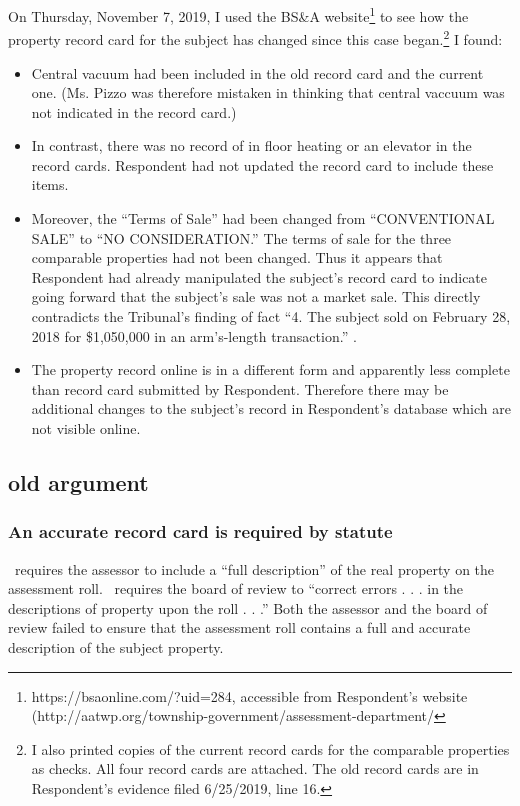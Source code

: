 \documentclass[12pt,\documentclassflag]{michiganCourtOfAppealsBrief}
\begin{document}
On Thursday, November 7, 2019, I used the BS&A website\footnote{https://bsaonline.com/?uid=284, accessible from   Respondent's website (http://aatwp.org/township-government/assessment-department/}
to see how the property record card for the subject has changed since this case began.\footnote{I also printed copies of the current record cards for the comparable properties as checks. All four record cards are attached. The old record cards are in Respondent's evidence filed 6/25/2019, line 16.} I found:

\begin{itemize}
\item Central vacuum had been included in the old record card and the current one. (Ms. Pizzo was therefore mistaken in thinking that central vaccuum was not indicated in the record card.)
\item In contrast, there was no record of in floor heating or an elevator in the record cards. Respondent had not updated the record card to include these items.
\item Moreover, the ``Terms of Sale'' had been changed from ``CONVENTIONAL SALE'' to ``NO CONSIDERATION.''
  The terms of sale for the three comparable properties %
  had not been changed. Thus it appears that Respondent had already manipulated the subject's record card to indicate going forward that the subject's sale was not a market sale. This directly contradicts the Tribunal's finding of fact ``4. The subject sold on February 28, 2018 for \$1,050,000 in an arm's-length transaction.'' .
\item The property record online is in a different form and apparently less complete than record card submitted by Respondent. Therefore there may be additional changes to the subject's record in Respondent's database which are not visible online.
\end{itemize}

\subsection{old argument}
\subsubsection{An accurate record card is required by statute}

\cite{MCL 211.24(1)}\ requires the assessor to include a ``full description'' of the real property on the assessment roll. \cite{MCL 211.29(2)}\ requires the board of review to ``correct errors . . . in the descriptions of property upon the roll . . .'' Both the assessor and the board of review failed to ensure that the assessment roll contains a full and accurate description of the subject property.
\end{document}
